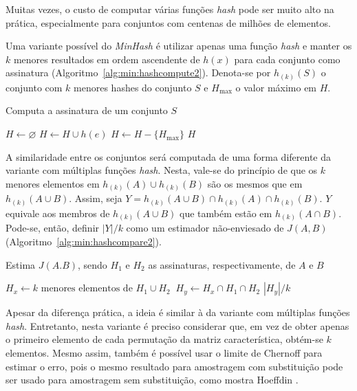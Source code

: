 Muitas vezes, o custo de computar várias funções \emph{hash} pode ser muito alto na prática, especialmente para conjuntos com centenas de milhões de elementos.

Uma variante possível do \emph{MinHash} é utilizar apenas uma função \emph{hash} e manter os $k$ menores resultados em ordem ascendente de $h(x)$ para cada conjunto como assinatura (Algoritmo~\ref{alg:min:hashcompute2}). Denota-se por $h_{(k)}(S)$ o conjunto com $k$ menores hashes do conjunto $S$ e $H_{\max}$ o valor máximo em $H$. 

\begin{algorithm}
\linespread{1}\selectfont
\caption{Computa a assinatura de um conjunto $S$}
\label{alg:min:hashcompute2}
\begin{algorithmic}[1]
    \State $H \gets \varnothing$
        \State $H \gets H \cup h(e)$
            \State $H \gets H - \{H_{\max}\}$
        \EndIf
    \EndFor
	\Return $H$
\EndFunction
\end{algorithmic}
\end{algorithm}

A similaridade entre os conjuntos será computada de uma forma diferente da variante com múltiplas funções \emph{hash}. Nesta, vale-se do princípio de que os $k$ menores elementos em $h_{(k)}(A) \cup h_{(k)}(B)$ são os mesmos que em $h_{(k)}(A \cup B)$. Assim, seja $Y = h_{(k)}(A \cup B) \cap h_{(k)}(A) \cap h_{(k)}(B)$.  $Y$ equivale aos membros de $h_{(k)}(A \cup B)$ que também estão em $ h_{(k)}(A \cap B)$. Pode-se, então, definir $|Y|/k$ como um estimador não-enviesado de $J(A, B)$ (Algoritmo~\ref{alg:min:hashcompare2}).

\begin{algorithm}
\linespread{1}\selectfont
\caption{Estima $J(A. B)$, sendo $H_1$ e $H_2$ as assinaturas, respectivamente, de $A$ e $B$}
\label{alg:min:hashcompare2}
\begin{algorithmic}[1]
    \State $H_x \gets k \text{ menores elementos de } H_1 \cup H_2 \ $
    \State $H_y \gets H_x \cap H_1 \cap H_2 $
	\Return $|H_y|/k$
\EndFunction
\end{algorithmic}
\end{algorithm}

Apesar da diferença prática, a ideia é similar à da variante com múltiplas funções \emph{hash}. Entretanto, nesta variante é preciso considerar que, em vez de obter apenas o primeiro elemento de cada permutação da matriz característica, obtém-se $k$ elementos. Mesmo assim, também é possível usar o limite de Chernoff para estimar o erro, pois o mesmo resultado para amostragem com substituição pode ser usado para amostragem sem substituição, como mostra Hoeffdin \cite{hoeffding1963probability,bardenet2015concentration}.

